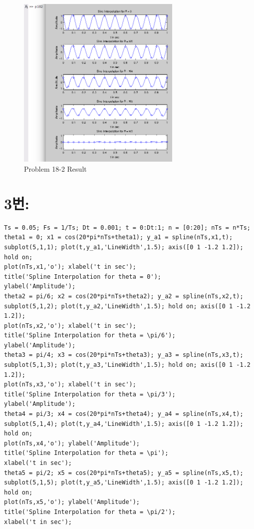 \documentclass[11pt
  , a4paper
  , article
  , oneside
]{memoir}
\begin{document}
\begin{figure}[h!]
	\centering
	\includegraphics[width=0.7\textwidth,height=0.4\textwidth]{./images/p18-2.png}
	\caption{Problem 18-2 Result}
	\label{fig:Problem 18-2 Result}
\end{figure}

\clearpage

\section{3번: }
\begin{lstlisting}[style=termstyle]
%Problem 3.18-3
Ts = 0.05; Fs = 1/Ts; Dt = 0.001; t = 0:Dt:1; n = [0:20]; nTs = n*Ts;
theta1 = 0; x1 = cos(20*pi*nTs+theta1); y_a1 = spline(nTs,x1,t);
subplot(5,1,1); plot(t,y_a1,'LineWidth',1.5); axis([0 1 -1.2 1.2]); hold on;
plot(nTs,x1,'o'); xlabel('t in sec');
title('Spline Interpolation for theta = 0');
ylabel('Amplitude');
theta2 = pi/6; x2 = cos(20*pi*nTs+theta2); y_a2 = spline(nTs,x2,t);
subplot(5,1,2); plot(t,y_a2,'LineWidth',1.5); hold on; axis([0 1 -1.2 1.2]);
plot(nTs,x2,'o'); xlabel('t in sec');
title('Spline Interpolation for theta = \pi/6');
ylabel('Amplitude');
theta3 = pi/4; x3 = cos(20*pi*nTs+theta3); y_a3 = spline(nTs,x3,t);
subplot(5,1,3); plot(t,y_a3,'LineWidth',1.5); hold on; axis([0 1 -1.2 1.2]);
plot(nTs,x3,'o'); xlabel('t in sec');
title('Spline Interpolation for theta = \pi/3');
ylabel('Amplitude');
theta4 = pi/3; x4 = cos(20*pi*nTs+theta4); y_a4 = spline(nTs,x4,t);
subplot(5,1,4); plot(t,y_a4,'LineWidth',1.5); axis([0 1 -1.2 1.2]); hold on;
plot(nTs,x4,'o'); ylabel('Amplitude');
title('Spline Interpolation for theta = \pi');
xlabel('t in sec');
theta5 = pi/2; x5 = cos(20*pi*nTs+theta5); y_a5 = spline(nTs,x5,t);
subplot(5,1,5); plot(t,y_a5,'LineWidth',1.5); axis([0 1 -1.2 1.2]); hold on;
plot(nTs,x5,'o'); ylabel('Amplitude');
title('Spline Interpolation for theta = \pi/2');
xlabel('t in sec');
\end{lstlisting}
\end{document}
